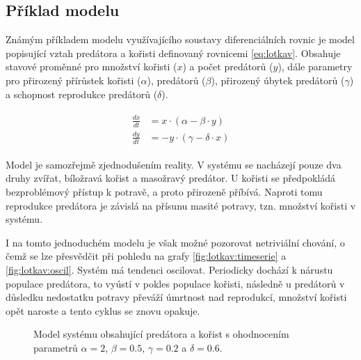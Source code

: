 
\subsection{Příklad modelu}\label{section:lotkav}

Známým příkladem modelu využívajícího soustavy diferenciálních rovnic je model popisující vztah predátora
a kořisti \cite{lotka1925} definovaný rovnicemi \ref{eq:lotkav}. Obsahuje stavové pro\-měn\-né
pro množství kořisti ($x$) a počet predátorů ($y$), dále parametry pro přirozený
přírůstek kořisti ($\alpha$),  predátorů ($\beta$), přirozený úbytek
predátorů ($\gamma$) a schopnost reprodukce predátorů ($\delta$).

\begin{align}\label{eq:lotkav}
\begin{array}{ll}
\frac{dx}{dt} &= x\cdot(\alpha - \beta \cdot y)			\\
\frac{dy}{dt} &= -y \cdot (\gamma - \delta \cdot x)
\end{array}
\end{align}

Model je samozřejmě zjednodušením reality. V systému se nacházejí pouze dva druhy
zvířat, bíložravá kořist a masožravý predátor. U kořisti se předpokládá bezproblémový
přístup k potravě, a proto přirozeně příbívá. Naproti tomu reprodukce predátora je
závislá na přísunu masité potravy, tzn. množství kořisti v systému.

I na tomto jednoduchém modelu je však možné pozorovat netriviální chování, o čemž se lze přesvědčit
při pohledu na grafy  \ref{fig:lotkav:timeserie} a \ref{fig:lotkav:oscil}. Systém má
tendenci oscilovat. Periodicky dochází k nárustu populace predátora, to vyústí v pokles
populace kořisti, následně u predátorů v důsledku nedostatku potravy převáží úmrtnost nad reprodukcí,
množství kořisti opět naroste a tento cyklus se znovu opakuje.

\begin{figure}[h!]
\begin{center}
\end{center}
\caption{Model systému obsahující predátora a kořist s ohodnocením parametrů $\alpha = 2$,  $\beta = 0.5$, $\gamma = 0.2$ a $\delta = 0.6$.}
\end{figure}

